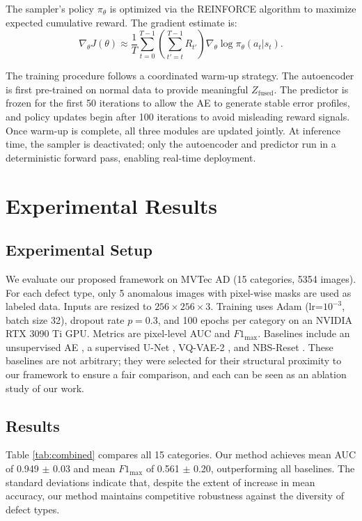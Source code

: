 \documentclass[twoside]{article}
\begin{document}
The sampler's policy \( \pi_\theta \) is optimized via the REINFORCE algorithm to maximize expected cumulative reward. The gradient estimate is:
\[
\nabla_\theta J(\theta) \approx \frac{1}{T} \sum_{t=0}^{T-1} \left( \sum_{t'=t}^{T-1} R_{t'} \right) \nabla_\theta \log \pi_\theta(a_t | s_t).
\]

The training procedure follows a coordinated warm-up strategy. The autoencoder is first pre-trained on normal data to provide meaningful \( Z_{\text{fused}} \). The predictor is frozen for the first 50 iterations to allow the AE to generate stable error profiles, and policy updates begin after 100 iterations to avoid misleading reward signals. Once warm-up is complete, all three modules are updated jointly. At inference time, the sampler is deactivated; only the autoencoder and predictor run in a deterministic forward pass, enabling real-time deployment.

\section{Experimental Results}

\subsection{Experimental Setup}

We evaluate our proposed framework on MVTec AD \cite{bergmann2021mvtec} (15 categories, 5354 images). For each defect type, only 5 anomalous images with pixel-wise masks are used as labeled data. Inputs are resized to \(256\times256\times3\). Training uses Adam (lr=\(10^{-3}\), batch size 32), dropout rate \(p=0.3\), and 100 epochs per category on an NVIDIA RTX 3090 Ti GPU. Metrics are pixel-level AUC and \(F1_{\text{max}}\). Baselines include an unsupervised AE \cite{baur2018}, a supervised U-Net \cite{ronneberger2015}, VQ-VAE-2 \cite{yapp2024}, and NBS-Reset \cite{chu2020}. These baselines are not arbitrary; they were selected for their structural proximity to our framework to ensure a fair comparison, and each can be seen as an ablation study of our work.

\subsection{Results}
 
Table \ref{tab:combined} compares all 15 categories. Our method achieves mean AUC of 0.949 $\pm$ 0.03 and mean \(F1_{\text{max}}\) of 0.561 $\pm$ 0.20, outperforming all baselines. The standard deviations indicate that, despite the extent of increase in mean accuracy, our method maintains competitive robustness against the diversity of defect types.
\end{document}
